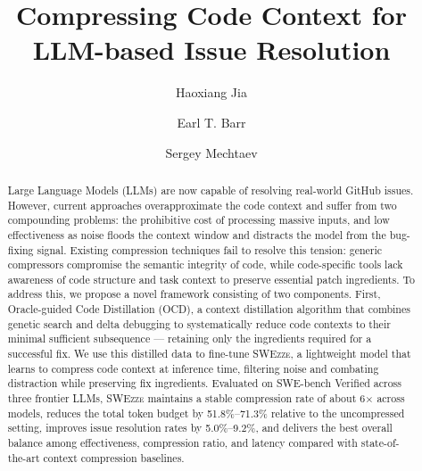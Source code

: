 \documentclass[sigconf,nonacm]{acmart}
\newcommand{\projName}{\textsc{SWEzze}\xspace}
\begin{document}
\title{Compressing Code Context for LLM-based Issue Resolution}


\author{Haoxiang Jia}


\author{Earl T. Barr}


\author{Sergey Mechtaev}


\begin{abstract}
Large Language Models (LLMs) are now capable of resolving real-world GitHub issues. However, current approaches overapproximate the code context and suffer from two compounding problems: the prohibitive cost of processing massive inputs, and low effectiveness as noise floods the context window and distracts the model from the bug-fixing signal. Existing compression techniques fail to resolve this tension: generic compressors compromise the semantic integrity of code, while code-specific tools lack awareness of code structure and task context to preserve essential patch ingredients. To address this, we propose a novel framework consisting of two components. First, Oracle-guided Code Distillation (OCD), a context distillation algorithm that combines genetic search and delta debugging to systematically reduce code contexts to their minimal sufficient subsequence --- retaining only the ingredients required for a successful fix. We use this distilled data to fine-tune \projName, a lightweight model that learns to compress code context at inference time, filtering noise and combating distraction while preserving fix ingredients. Evaluated on SWE-bench Verified across three frontier LLMs, \projName maintains a stable compression rate of about 6$\times$ across models, reduces the total token budget by 51.8\%--71.3\% relative to the uncompressed setting, improves issue resolution rates by 5.0\%--9.2\%, and delivers the best overall balance among effectiveness, compression ratio, and latency compared with state-of-the-art context compression baselines.
\end{abstract}


\maketitle
\end{document}
